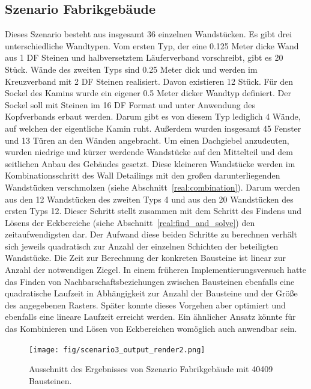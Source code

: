 \subsection{Szenario Fabrikgebäude}\label{poc:scenario3}
Dieses Szenario besteht aus insgesamt 36 einzelnen Wandstücken.
Es gibt drei unterschiedliche Wandtypen.
Vom ersten Typ, der eine 0.125 Meter dicke Wand aus 1 DF Steinen und halbversetztem Läuferverband vorschreibt, gibt es 20 Stück.
Wände des zweiten Typs sind 0.25 Meter dick und werden im Kreuzverband mit 2 DF Steinen realisiert.
Davon existieren 12 Stück.
Für den Sockel des Kamins wurde ein eigener 0.5 Meter dicker Wandtyp definiert.
Der Sockel soll mit Steinen im 16 DF Format und unter Anwendung des Kopfverbands erbaut werden.
Darum gibt es von diesem Typ lediglich 4 Wände, auf welchen der eigentliche Kamin ruht.
Außerdem wurden insgesamt 45 Fenster und 13 Türen an den Wänden angebracht.
Um einen Dachgiebel anzudeuten, wurden niedrige und kürzer werdende Wandstücke auf den Mittelteil und dem seitlichen Anbau des Gebäudes gesetzt.
Diese kleineren Wandstücke werden im Kombinationsschritt des Wall Detailings mit den großen darunterliegenden Wandstücken verschmolzen (siehe Abschnitt~\ref{real:combination}).
Darum werden aus den 12 Wandstücken des zweiten Typs 4 und aus den 20 Wandstücken des ersten Typs 12.
Dieser Schritt stellt zusammen mit dem Schritt des Findens und Lösens der Eckbereiche (siehe Abschnitt~\ref{real:find_and_solve}) den zeitaufwendigsten dar.
Der Aufwand diese beiden Schritte zu berechnen verhält sich jeweils quadratisch zur Anzahl der einzelnen Schichten der beteiligten Wandstücke.
Die Zeit zur Berechnung der konkreten Bausteine ist linear zur Anzahl der notwendigen Ziegel.
In einem früheren Implementierungsversuch hatte das Finden von Nachbarschaftsbeziehungen zwischen Bausteinen ebenfalls eine quadratische Laufzeit in Abhängigkeit zur Anzahl der Bausteine und der Größe des angegebenen Rasters.
Später konnte dieses Vorgehen aber optimiert und ebenfalls eine lineare Laufzeit erreicht werden.
Ein ähnlicher Ansatz könnte für das Kombinieren und Lösen von Eckbereichen womöglich auch anwendbar sein.

\begin{figure}[bt]
  \centering
  \texttt{[image: fig/scenario3\_output\_render2.png]}
  \caption{Ausschnitt des Ergebnisses von Szenario Fabrikgebäude mit 40409 Bausteinen.}\label{fig:poc:scenario3}
\end{figure}


